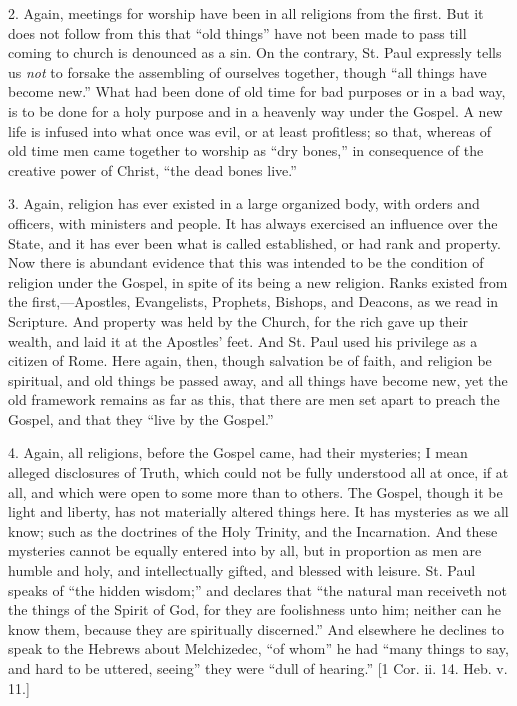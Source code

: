 2. Again, meetings for worship have been in all religions from the
first. But it does not follow from this that ``old things''
have not been made to pass till coming to church is denounced as a
sin. On the contrary, St. Paul expressly tells us \emph{not} to forsake the
assembling of ourselves together, though ``all things have become
new.'' What had been done of old time for bad purposes or in a bad
way, is to be done for a holy purpose and in a heavenly way under the
Gospel. A new life is infused into what once was evil, or at least
profitless; so that, whereas of old time men came together to worship
as ``dry bones,'' in consequence of the creative power of
Christ, ``the dead bones live.''

3. Again, religion has ever existed in a large organized body, with
orders and officers, with ministers and people. It has always
exercised an influence over the State, and it has ever been what is
called established, or had rank and property. Now there is abundant
evidence that this was intended to be the condition of religion under
the Gospel, in spite of its being a new religion. Ranks existed from
the first,—Apostles, Evangelists, Prophets, Bishops, and Deacons, as
we read in Scripture. And property was held by the Church, for the
rich gave up their wealth, and laid it at the Apostles' feet. And St.
Paul used his privilege as a citizen of Rome. Here again, then, though
salvation be of faith, and religion be spiritual, and old things be
passed away, and all things have become new, yet the old framework
remains as far as this, that there are men set apart to preach the
Gospel, and that they ``live by the Gospel.''

4. Again, all religions, before the Gospel came, had their
mysteries; I mean alleged disclosures of Truth, which could not be
fully understood all at once, if at all, and which were open to some
more than to others. The Gospel, though it be light and liberty, has
not materially altered things here. It has mysteries as we all know;
such as the doctrines of the Holy Trinity, and the Incarnation. And
these mysteries cannot be equally entered into by all, but in
proportion as men are humble and holy, and intellectually gifted, and
blessed with leisure. St. Paul speaks of ``the hidden
wisdom;'' and declares that ``the natural man receiveth not
the things of the Spirit of God, for they are foolishness unto him;
neither can he know them, because they are spiritually
discerned.'' And elsewhere he declines to speak to the Hebrews
about Melchizedec, ``of whom'' he had ``many things to
say, and hard to be uttered, seeing'' they were ``dull of
hearing.'' [1 Cor. ii. 14. Heb. v. 11.]

